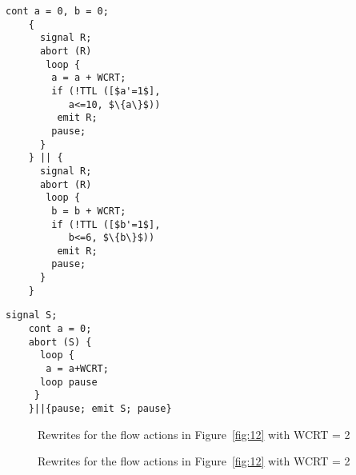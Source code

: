 \documentclass[10pt,journal,cspaper,compsoc]{IEEEtran}
\begin{document}
\newbox{\rfourth}
\begin{lrbox}{\rfourth}
  \begin{lstlisting}[mathescape,style=sysj,morekeywords={until,cont,
      wait_inbetween,signal,loop,abort,await,emit,present,trap,pause,exit,delay,suspend}]
    cont a = 0, b = 0; 
    {
      signal R;
      abort (R) 
       loop {
        a = a + WCRT;
        if (!TTL ([$a'=1$], 
           a<=10, $\{a\}$)) 
         emit R;
        pause;
      }
    } || {
      signal R;
      abort (R) 
       loop {
        b = b + WCRT;
        if (!TTL ([$b'=1$], 
           b<=6, $\{b\}$))
         emit R;
        pause;
      }
    }
  \end{lstlisting}
\end{lrbox}

\newbox{\rfifth}
\begin{lrbox}{\rfifth}
  \begin{lstlisting}[mathescape,style=sysj,morekeywords={until,wait_inbetween,
      cont,signal,loop,abort,await,emit,present,trap,pause,exit,delay,suspend}]
    signal S;
    cont a = 0;
    abort (S) {
      loop {
       a = a+WCRT; 
      loop pause 
     }
    }||{pause; emit S; pause}
  \end{lstlisting}
\end{lrbox}

\begin{figure}[t!]
  \centering
  \hspace{10pt}

  \hspace{10pt}
  
  \caption{Rewrites for the flow actions in Figure~\ref{fig:12}
    with WCRT = 2}
  \label{fig:14}
\end{figure}

\begin{figure}[t!]
  \ContinuedFloat
  \centering
  \hspace{10pt}

  \hspace{10pt}

  \caption{Rewrites for the flow actions in Figure~\ref{fig:12}
    with WCRT = 2}
  \label{fig:14}
\end{figure}
\end{document}
